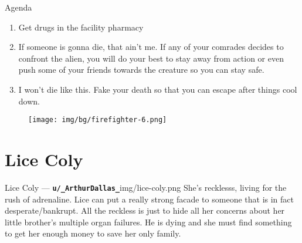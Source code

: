 \begin{rpg-commentbox}{Agenda}
    \begin{enumerate}[label=\textbf{Act \arabic*}, leftmargin=1cm]
        \item Get drugs in the facility pharmacy
        \item If someone is gonna die, that ain't me. If any of your comrades decides to confront the alien, you will do your best to stay away from action or even push some of your friends towards the creature so you can stay safe.
        \item I won't die like this. Fake your death so that you can escape after things cool down.
    \end{enumerate}
\end{rpg-commentbox}


\begin{figure}
    \hspace*{-1in}
    \texttt{[image: img/bg/firefighter-6.png]}
    \label{fig:refinery}
\end{figure}


\newsect

\clearpage





\section{Lice Coly}

\begin{rpg-pcbox}{Lice Coly --- \texttt{\textbf{u/\_ArthurDallas\_}}}{img/lice-coly.png}
    She's recklesss, living for the rush of adrenaline. Lice can put a really strong facade to someone that is in fact desperate/bankrupt. All the reckless is just to hide all her concerns about her little brother's multiple organ failures. He is dying and she must find something to get her enough money to save her only family.
\end{rpg-pcbox}

